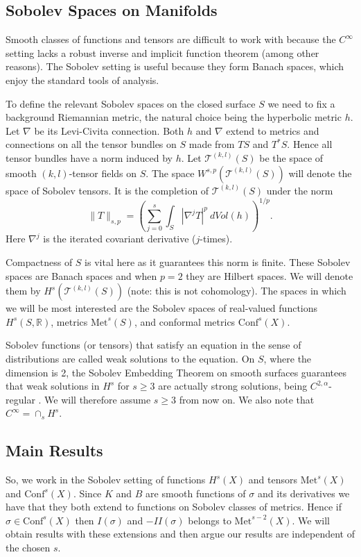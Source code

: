 \documentclass{amsart}
\newcommand{\R}{\mathbb{R}}
\newcommand{\two}{I\!\!I}
\begin{document}
\subsection{Sobolev Spaces on Manifolds}



Smooth classes of functions and tensors are difficult to work with because the $C^\infty$ setting lacks a robust inverse and implicit function theorem (among other reasons). 
The Sobolev setting is useful because they form Banach spaces, which enjoy the standard tools of analysis. 

To define the relevant Sobolev spaces on the closed surface $S$ we need to fix a background Riemannian metric, the natural choice being the hyperbolic metric $h$. 
Let $\nabla$ be its Levi-Civita connection. 
Both $h$ and $\nabla$ extend to metrics and connections on all the tensor bundles on $S$ made from $TS$ and $T^*S$. 
Hence all tensor bundles have a norm induced by $h$. 
Let $\mathscr{T}^{(k,l)}(S)$ be the space of smooth $(k,l)$-tensor fields on $S$. 
The space $W^{s,p}(\mathscr{T}^{(k,l)}(S))$ will denote the space of Sobolev tensors. 
It is the completion of $\mathscr{T}^{(k,l)}(S)$ under the norm
\[
\|T\|_{s,p} = \left( \sum_{j = 0}^s \int_S | \nabla^j T|^p \ dVol(h) \right)^{1/p}.
\]
Here $\nabla^j$ is the iterated covariant derivative ($j$-times). 

Compactness of $S$ is vital here as it guarantees this norm is finite. 
These Sobolev spaces are Banach spaces and when $p = 2$ they are Hilbert spaces. 
We will denote them by $H^s(\mathscr{T}^{(k,l)}(S))$ (note: this is not cohomology). 
The spaces in which we will be most interested are the Sobolev spaces of real-valued functions $H^s(S,\R)$, metrics $\mathrm{Met}^s(S)$, and conformal metrics $\mathrm{Conf}^s(X)$.

Sobolev functions (or tensors) that satisfy an equation in the sense of distributions are called weak solutions to the equation. 
On $S$, where the dimension is 2, the Sobolev Embedding Theorem on smooth surfaces guarantees that weak solutions in $H^s$ for $s \geq 3$ are actually strong solutions, being $C^{2,\alpha}$-regular \cite{aubin1982}. 
We will therefore assume $s \geq 3$ from now on. 
We also note that $C^\infty = \cap_s H^s$.



\subsection{Main Results}
So, we work in the Sobolev setting of functions $H^s(X)$ and tensors $\mathrm{Met}^s(X)$ and $\mathrm{Conf}^s(X)$.
Since $K$ and $B$ are smooth functions of $\sigma$ and its derivatives we have that they both extend to functions on Sobolev classes of metrics.
Hence if $\sigma \in \mathrm{Conf}^s(X)$ then $I(\sigma)$ and $-\two(\sigma)$ belongs to $\mathrm{Met}^{s-2}(X)$.
We will obtain results with these extensions and then argue our results are independent of the chosen $s$. 
\end{document}
